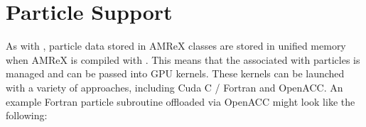\documentclass[letterpaper,10pt,english]{sphinxmanual}
\begin{document}
\section{Particle Support}
\label{\detokenize{GPU:particle-support}}\label{\detokenize{GPU:sec-gpu-particle}}
\sphinxAtStartPar
As with , particle data stored in AMReX  classes are
stored in unified memory when AMReX is compiled with . This means that the  associated with particles
is managed and can be passed into GPU kernels. These kernels can be launched with a variety of approaches,
including Cuda C / Fortran and OpenACC. An example Fortran particle subroutine offloaded via OpenACC might
look like the following:
\end{document}
